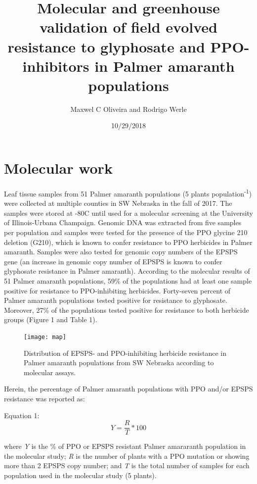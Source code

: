 \documentclass[]{article}
\title{Molecular and greenhouse validation of field evolved resistance to
glyphosate and PPO-inhibitors in Palmer amaranth populations}
\author{Maxwel C Oliveira and Rodrigo Werle}
\date{10/29/2018}
\begin{document}
\maketitle

\tableofcontents 

\pagebreak

\section{Molecular work}\label{molecular-work}

Leaf tissue samples from 51 Palmer amaranth populations (5 plants
population\textsuperscript{-1}) were collected at multiple counties in
SW Nebraska in the fall of 2017. The samples were stored at -80C until
used for a molecular screening at the University of Illinois-Urbana
Champaign. Genomic DNA was extracted from five samples per population
and samples were tested for the presence of the PPO glycine 210 deletion
(G210), which is known to confer resistance to PPO herbicides in Palmer
amaranth. Samples were also tested for genomic copy numbers of the EPSPS
gene (an increase in genomic copy number of EPSPS is known to confer
glyphosate resistance in Palmer amaranth). According to the molecular
results of 51 Palmer amaranth populations, 59\% of the populations had
at least one sample positive for resistance to PPO-inhibiting
herbicides. Forty-seven percent of Palmer amaranth populations tested
positive for resistance to glyphosate. Moreover, 27\% of the populations
tested positive for resistance to both herbicide groups (Figure 1 and
Table 1).

\begin{figure}[h]

{\centering \texttt{[image: map]} 

}

\caption{Distribution of EPSPS- and PPO-inhibiting herbicide resistance in Palmer amaranth populations from SW Nebraska according to molecular assays.}\label{fig:unnamed-chunk-1}
\end{figure}

Herein, the percentage of Palmer amaranth populations with PPO and/or
EPSPS resistance was reported as:

Equation 1: \[Y=\frac{R}{T} * 100 \]

where \emph{Y} is the \% of PPO or EPSPS resistant Palmer amararanth
population in the molecular study; \emph{R} is the number of plants with
a PPO mutation or showing more than 2 EPSPS copy number; and \emph{T} is
the total number of samples for each population used in the molecular
study (5 plants).
\end{document}
